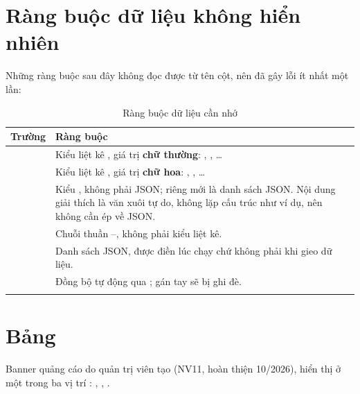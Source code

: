 \section{Ràng buộc dữ liệu không hiển nhiên}

Những ràng buộc sau đây không đọc được từ tên cột, nên đã gây lỗi ít nhất một lần:

\begin{longtable}{L{5.2cm} L{8.4cm}}
\toprule
\textbf{Trường} & \textbf{Ràng buộc}\\
\midrule
\endhead
{} & Kiểu liệt kê , giá trị \textbf{chữ thường}: , , \ldots\\
 & Kiểu liệt kê , giá trị \textbf{chữ hoa}: , , \ldots\\
 & Kiểu , không phải JSON; riêng  mới là danh sách JSON. Nội dung giải thích là văn xuôi tự do, không lặp cấu trúc như ví dụ, nên không cần ép về JSON.\\
 & Chuỗi thuần --, không phải kiểu liệt kê.\\
 & Danh sách JSON, được điền lúc chạy chứ không phải khi gieo dữ liệu.\\
 & Đồng bộ tự động qua ; gán tay sẽ bị ghi đè.\\
\bottomrule
\caption{Ràng buộc dữ liệu cần nhớ}
\end{longtable}

\section{Bảng }

Banner quảng cáo do quản trị viên tạo (NV11, hoàn thiện 10/2026), hiển thị ở một trong ba
vị trí : , , .

